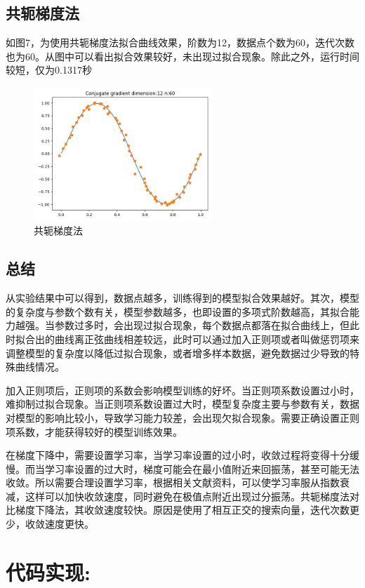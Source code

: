 \documentclass[a4paper,11pt,UTF8]{ctexart}
\newcommand{\bottomcaption}{%
\setlength{\abovecaptionskip}{6pt}%
\setlength{\belowcaptionskip}{6pt}%
\caption}
\begin{document}
\subsection{共轭梯度法}
如图7，为使用共轭梯度法拟合曲线效果，阶数为12，数据点个数为60，迭代次数也为60。从图中可以看出拟合效果较好，未出现过拟合现象。除此之外，运行时间较短，仅为0.1317秒
\begin{figure}[htbp]
	\centering
	\includegraphics[width=0.6\textwidth]{3_1.png}
	\bottomcaption{共轭梯度法}
\end{figure}

\subsection{总结}
从实验结果中可以得到，数据点越多，训练得到的模型拟合效果越好。其次，模型的复杂度与参数个数有关，模型参数越多，也即设置的多项式阶数越高，其拟合能力越强。当参数过多时，会出现过拟合现象，每个数据点都落在拟合曲线上，但此时拟合出的曲线离正弦曲线相差较远，此时可以通过加入正则项或者叫做惩罚项来调整模型的复杂度以降低过拟合现象，或者增多样本数据，避免数据过少导致的特殊曲线情况。 \par
加入正则项后，正则项的系数会影响模型训练的好坏。当正则项系数设置过小时，难抑制过拟合现象。当正则项系数设置过大时，模型复杂度主要与参数有关，数据对模型的影响比较小，导致学习能力较差，会出现欠拟合现象。需要正确设置正则项系数，才能获得较好的模型训练效果。 \par
在梯度下降中，需要设置学习率，当学习率设置的过小时，收敛过程将变得十分缓慢。而当学习率设置的过大时，梯度可能会在最小值附近来回振荡，甚至可能无法收敛。所以需要合理设置学习率，根据相关文献资料，可以使学习率服从指数衰减，这样可以加快收敛速度，同时避免在极值点附近出现过分振荡。共轭梯度法对比梯度下降法，其收敛速度较快。原因是使用了相互正交的搜索向量，迭代次数更少，收敛速度更快。

\section{代码实现:}
\end{document}
